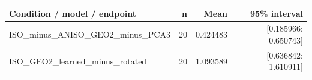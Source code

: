\begin{longtable}{p{.56\linewidth}rrr}
\toprule Condition / model / endpoint & n & Mean & 95\% interval\\\midrule
ISO\_minus\_ANISO\_GEO2\_minus\_PCA3 & 20 & 0.424483 & [0.185966; 0.650743] \\
ISO\_GEO2\_learned\_minus\_rotated & 20 & 1.093589 & [0.636842; 1.610911] \\
\bottomrule\end{longtable}
